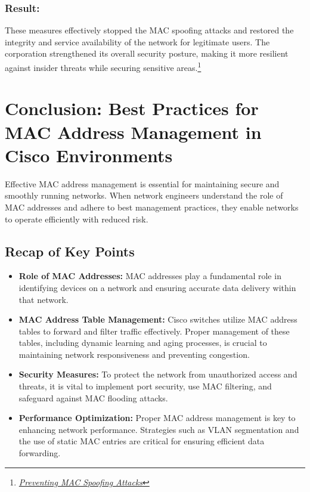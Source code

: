 \documentclass[11pt,a4paper]{article}
\begin{document}
\subsubsection*{Result:}
These measures effectively stopped the MAC spoofing attacks and restored the integrity and service availability of the network for legitimate users. The corporation strengthened its overall security posture, making it more resilient against insider threats while securing sensitive areas.\footnote{\href{https://community.cisco.com/kxiwq67737/attachments/kxiwq67737/4561-docs-security/6636/1/Mac_spoofing_case_study_v2.pdf}{\textit{Preventing MAC Spoofing Attacks}}}

\section*{Conclusion: Best Practices for MAC Address Management in Cisco Environments}

Effective MAC address management is essential for maintaining secure and smoothly running networks. When network engineers understand the role of MAC addresses and adhere to best management practices, they enable networks to operate efficiently with reduced risk.

\subsection*{Recap of Key Points}
    \begin{itemize}
        \item \textbf{Role of MAC Addresses:} MAC addresses play a fundamental role in identifying devices on a network and ensuring accurate data delivery within that network.
        \item \textbf{MAC Address Table Management:} Cisco switches utilize MAC address tables to forward and filter traffic effectively. Proper management of these tables, including dynamic learning and aging processes, is crucial to maintaining network responsiveness and preventing congestion.
        \item \textbf{Security Measures:} To protect the network from unauthorized access and threats, it is vital to implement port security, use MAC filtering, and safeguard against MAC flooding attacks.
        \item \textbf{Performance Optimization:} Proper MAC address management is key to enhancing network performance. Strategies such as VLAN segmentation and the use of static MAC entries are critical for ensuring efficient data forwarding.
    \end{itemize}


    
\end{document}
